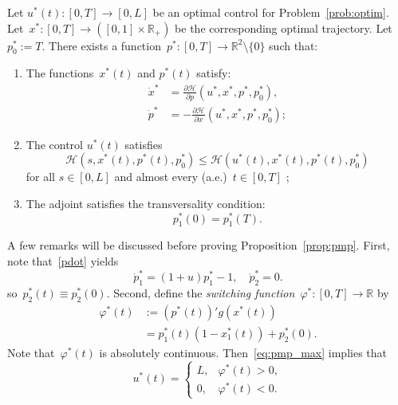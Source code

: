\begin{proposition}[PMP] \label{prop:pmp}
	Let $u^*(t):[0,T] \to [0,L]$ be an optimal control for 
	Problem~\ref{prob:optim}. Let~$x^*:[0,T] \to ([0,1] \times \mathbb{R}_+)$ be the corresponding optimal   trajectory. Let $p_0^*:=T $. There exists a
	function~$p^*: [0,T] \to  \mathbb{R}^2\setminus\{0\}$ such that:
	\begin{enumerate}
		\item The functions~$x^*(t)$ and $p^*(t)$ satisfy:
		\begin{subequations}
			\begin{align} \label{pdot}
				\dot  x^* & = \frac{\partial \mathcal H}{\partial p}(u^*,x^*,p^*,p_0^*) , \\ 
				\dot  p^* & = -\frac{\partial \mathcal H}{\partial x}(u^*,x^*,p^*,p_0^*);
			\end{align}
		\end{subequations}
		\item The control $u^*(t)$  satisfies
		\begin{equation}\label{eq:pmp_max}
			\mathcal H(s,x^*(t),p^*(t),p_0^*) \le \mathcal H(u^*(t),x^*(t),p^*(t),p_0^*)
		\end{equation}
		for all $s \in [0,L]$  and almost every (a.e.)~$t \in [0,T]$ ;
		\item The adjoint  satisfies the 
		transversality condition:
		\begin{equation} \label{eq:trans}
			p_1^*(0) = p_1^*(T).
		\end{equation}
	\end{enumerate}
\end{proposition}

A few remarks will be discussed before proving Proposition~\ref{prop:pmp}. 
First, note that~\eqref{pdot} yields
\begin{equation}
\dot p_1^*=	  (1+u)p_1^*-1,
\quad 	\dot p_2^*=0.
\end{equation}
so~$p_2^*(t)\equiv p_2^*(0)$. 
Second, define the \emph{switching function}~$\varphi^*:[0,T]\to\mathbb{R}$ by
%
\begin{subequations}
	\begin{align}\label{switching_function}
		\varphi^*(t)&:= (p^*(t))' g(x^*(t))\\&=
		p_1^*(t) (1-x_1^*(t)) + p_2^*(0).
	\end{align}
\end{subequations}
%
Note that~$\varphi^*(t)$ is absolutely continuous. 
Then~\eqref{eq:pmp_max} implies that
\begin{equation}\label{eq:ubang}
	u^*(t) = \begin{cases}
		L, & \varphi^*(t)>0,\\
		0, & \varphi^*(t)<0.
	\end{cases}
\end{equation}

